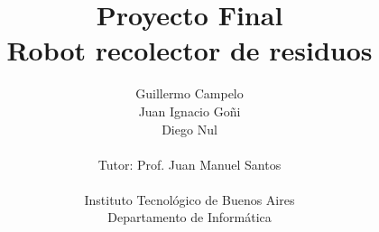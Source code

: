 \documentclass[a4paper,10pt]{article}
\title{Proyecto Final\\Robot recolector de residuos}
\author{Guillermo Campelo\\Juan Ignacio Go\~ni\\Diego Nul\\ \\Tutor: Prof. Juan Manuel Santos\\ \\Instituto Tecnol\'ogico de Buenos Aires\\Departamento de Inform\'atica}
\begin{document}
\maketitle



\newpage

\tableofcontents

\newpage

\listoftables

\newpage

\listoffigures

\newpage



\newpage



\newpage



\newpage



\newpage



\newpage



\newpage



\nocite{*}


\end{document}
